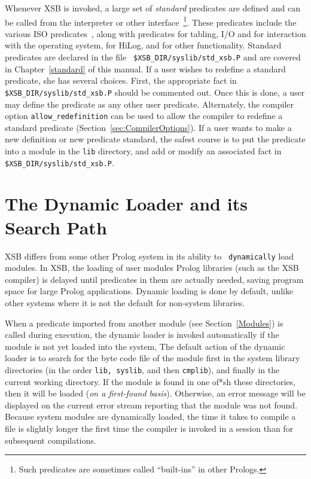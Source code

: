 Whenever XSB is invoked, a large set of {\em standard} predicates are
defined and can be called from the interpreter or other
interface~\footnote{Such predicates are sometimes called ``built-ins''
in other Prologs.}.  These predicates include the various ISO
predicates~\cite{}, along with predicates for tabling, I/O and for
interaction with the operating system, for HiLog, and for other
functionality.  Standard predicates are declared in the file {\tt
\$XSB\_DIR/syslib/std\_xsb.P} and are covered in
Chapter~\ref{standard} of this manual.  If a user wishes to redefine a
standard predicate, she has several choices.  First, the appropriate
fact in {\tt \$XSB\_DIR/syslib/std\_xsb.P} should be commented out.
Once this is done, a user may define the predicate as any other user
predicate.  Alternately, the compiler option {\tt allow\_redefinition}
can be used to allow the compiler to redefine a standard predicate
(Section~\ref{sec:CompilerOptions}).  If a user wants to make a new
definition or new predicate standard, the safest course is to put the
predicate into a module in the {\tt lib} directory, and add or modify
an associated fact in {\tt \$XSB\_DIR/syslib/std\_xsb.P}.

\section{The Dynamic Loader and its Search Path} \label{LibPath}

XSB differs from some other Prolog system in its ability to {\tt
dynamically} load modules.  In XSB, the loading of user modules Prolog
libraries (such as the XSB compiler) is delayed until predicates in
them are actually needed, saving program space for large Prolog
applications.  Dynamic loading is done by default, unlike other
systems where it is not the default for non-system libraries.

When a predicate imported from another module (see
Section~\ref{Modules}) is called during execution, the dynamic loader
is invoked automatically if the module is not yet loaded into the
system, The default action of the dynamic loader is to search for the
byte code file of the module first in the system library directories
(in the order {\tt lib, syslib}, and then {\tt cmplib}), and finally
in the current working directory.  If the module is found in one of*sh
these directories, then it will be loaded ({\em on a first-found
basis}). Otherwise, an error message will be displayed on the current
error stream reporting that the module was not found.  Because system
modules are dynamically loaded, the time it takes to compile a file is
slightly longer the first time the compiler is invoked in a session
than for subsequent compilations.


